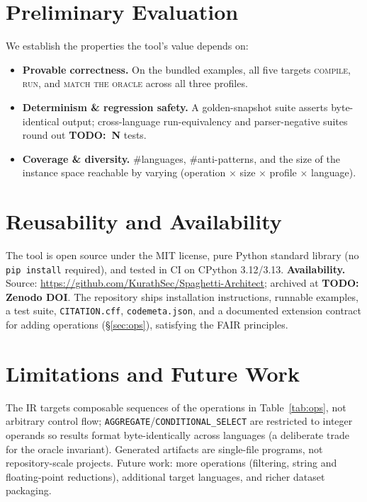 \documentclass[sigconf,nonacm=false]{acmart}
\begin{document}
\section{Preliminary Evaluation}
\label{sec:eval}
We establish the properties the tool's value depends on:
\begin{itemize}
  \item \textbf{Provable correctness.} On the bundled examples, all five targets
        \textsc{compile}, \textsc{run}, and \textsc{match the oracle} across all three
        profiles. %
  \item \textbf{Determinism \& regression safety.} A golden-snapshot suite asserts
        byte-identical output; cross-language run-equivalency and parser-negative
        suites round out \textbf{TODO:~N} tests.
  \item \textbf{Coverage \& diversity.} %
        #languages, #anti-patterns, and the size of the instance space reachable by
        varying (operation $\times$ size $\times$ profile $\times$ language).
\end{itemize}

\section{Reusability and Availability}
\label{sec:avail}
The tool is open source under the MIT license, pure Python standard library
(no \texttt{pip install} required), and tested in CI on CPython 3.12/3.13.
\textbf{Availability.} Source: \url{https://github.com/KurathSec/Spaghetti-Architect};
archived at \textbf{TODO: Zenodo DOI}. The repository ships installation
instructions, runnable examples, a test suite, \texttt{CITATION.cff},
\texttt{codemeta.json}, and a documented extension contract for adding operations
(\S\ref{sec:ops}), satisfying the FAIR principles.

\section{Limitations and Future Work}
\label{sec:limits}
The IR targets composable sequences of the operations in Table~\ref{tab:ops}, not
arbitrary control flow; \texttt{AGGREGATE}/\texttt{CONDITIONAL\_SELECT} are restricted
to integer operands so results format byte-identically across languages (a deliberate
trade for the oracle invariant). Generated artifacts are single-file programs, not
repository-scale projects. Future work: more operations (filtering, string and
floating-point reductions), additional target languages, and richer dataset packaging.
\end{document}
